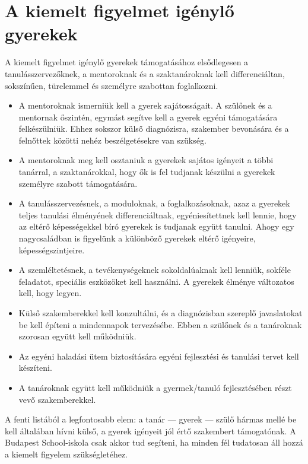 \hypertarget{a-kiemelt-figyelmet-igenylo-gyerekek}{%
\section{A kiemelt figyelmet igénylő
gyerekek}\label{a-kiemelt-figyelmet-igenylo-gyerekek}}

A kiemelt figyelmet igénylő gyerekek támogatásához elsődlegesen a
tanulásszervezőknek, a mentoroknak és a szaktanároknak kell
differenciáltan, sokszínűen, türelemmel és személyre szabottan
foglalkozni.

\begin{itemize}
\item
  A mentoroknak ismerniük kell a gyerek sajátosságait. A szülőnek és a
  mentornak őszintén, egymást segítve kell a gyerek egyéni támogatására
  felkészülniük. Ehhez sokszor külső diagnózisra, szakember bevonására és
  a felnőttek közötti nehéz beszélgetésekre van szükség.
\item
  A mentoroknak meg kell osztaniuk a gyerekek sajátos igényeit a többi
  tanárral, a szaktanárokkal, hogy ők is fel tudjanak készülni a
  gyerekek személyre szabott támogatására.
\item
  A tanulásszervezésnek, a moduloknak, a foglalkozásoknak, azaz a
  gyerekek teljes tanulási élményének differenciáltnak, egyéniesítettnek
  kell lennie, hogy az eltérő képességekkel bíró gyerekek is tudjanak
  együtt tanulni. Ahogy egy nagycsaládban is figyelünk a különböző
  gyerekek eltérő igényeire, képességszintjeire.
\item
  A szemléltetésnek, a tevékenységeknek sokoldalúaknak kell lenniük,
  sokféle feladatot, speciális eszközöket kell használni. A gyerekek
  élménye változatos kell, hogy legyen.
\item
  Külső szakemberekkel kell konzultálni, és a diagnózisban szereplő
  javaslatokat be kell építeni a mindennapok tervezésébe. Ebben a
  szülőnek és a tanároknak szorosan együtt kell működniük.
\item
  Az egyéni haladási ütem biztosítására egyéni fejlesztési és tanulási
  tervet kell készíteni.
\item
  A tanároknak együtt kell működniük a gyermek/tanuló fejlesztésében
  részt vevő szakemberekkel.
\end{itemize}

A fenti listából a legfontosabb elem: a tanár --- gyerek --- szülő hármas
mellé be kell általában hívni külső, a gyerek igényeit jól értő
szakembert támogatónak. A Budapest School-iskola csak akkor tud
segíteni, ha minden fél tudatosan áll hozzá a kiemelt figyelem
szükségletéhez.
